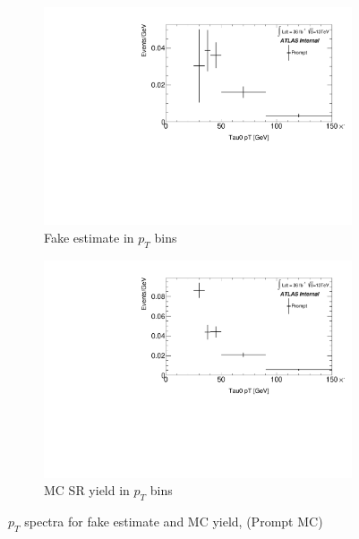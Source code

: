 \documentclass[11pt]{article}
\begin{document}
	\begin{figure}[H]
	\centering
	\begin{subfigure}{.5\textwidth}
	\centering
	\includegraphics[width=0.95\linewidth]{figures/FakesEstimate_data_pp8_nonallhad_new_scaledHists/hist_FakeEstimate_Prompt.pdf}
  	\caption{Fake estimate in $p_T$ bins}
  	\label{fig:sub1}
	\end{subfigure}%
	\begin{subfigure}{.5\textwidth}
	\centering
	\includegraphics[width=0.95\linewidth]{figures/FakesEstimate_data_pp8_nonallhad_new_scaledHists/hist_SRMC_Prompt.pdf}
	\caption{MC SR yield in $p_T$ bins}
	\end{subfigure}
	\caption{$p_T$ spectra for fake estimate and MC yield, (Prompt MC)}
	\end{figure}
\end{document}
